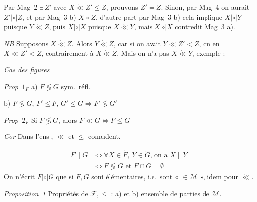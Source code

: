 \documentclass[11pt,a4paper]{article}
\begin{document}
Par Mag~2 $\exists\, Z'$ avec $X \mathring{\ll} Z' \leq Z$,   prouvons $Z' = Z$. Sinon, par Mag~4 on aurait $Z' |\circ| Z$, et par Mag~3 b) $X |\circ| Z$, d'autre part par Mag~3 b) cela implique $X |\circ| Y$ puisque $Y \mathring{\ll} Z$, puis $X |\circ| X$ puisque $X \mathring{\ll} Y$,  mais $X |\circ| X$ contredit Mag~3 a).


\emph{NB}  Supposons  $X \mathring{\ll} Z$. Alors $Y \mathring{\ll} Z$, car si on avait $Y \ll Z' < Z$, on en  $X \ll Z' < Z$, contrairement à $X \mathring{\ll} Z$.  Mais on n'a pas  $X \mathring{\ll} Y$, exemple :

\emph{Cas des figures}

\emph{Prop~$1_F$} a) $F \lessgtr G$ sym.\ réfl.

b) $F \lessgtr G$, $F' \leq F$, $G' \leq G \Rightarrow F' \lessgtr G'$

\emph{Prop~$2_F$} Si $F \lessgtr G$,  alors $F \ll G \Leftrightarrow F \leq G$

\emph{Cor} Dans l'ens , $\ll$ et $\leq$ coïncident.

\[
\begin{aligned}
  F \parallel G &\Longleftrightarrow \forall X \in \widetilde{F},\ Y \in \widetilde{G},\ \text{on a } X \parallel Y \\
  &\Longleftrightarrow F \lessgtr G \text{ et } F \cap G = \emptyset
\end{aligned}
\]
On n'écrit $F |\circ| G$ que si $F, G$ sont élémentaires, i.e.\ sont « $\in \mathcal{M}$ », idem pour $\mathring{\ll}$.

 

\emph{Proposition~1} Propriétés  de $\mathcal{F}, \leq$ : a)  \ill{} et b)   \ill{} ensemble de parties de $\mathcal{M}$.
\end{document}
